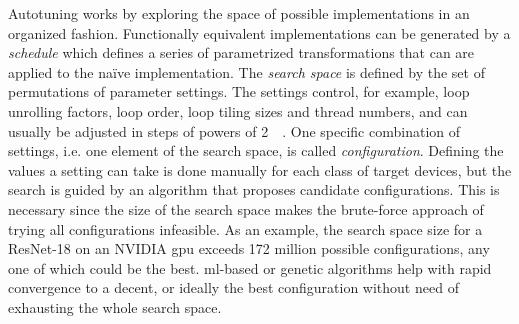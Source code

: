 Autotuning works by exploring the space of possible implementations in an organized fashion. Functionally equivalent implementations can be generated by a \textit{schedule} which defines a series of parametrized transformations that can are applied to the naïve implementation. The \textit{search space} is defined by the set of permutations of parameter settings. The settings control, for example, loop unrolling factors, loop order, loop tiling sizes and thread numbers, and can usually be adjusted in steps of powers of 2~\cite[p.~5]{Chen.2018b}~\cite[p.~16]{Vasilache.2018}. One specific combination of settings, i.e. one element of the search space, is called \textit{configuration}. Defining the values a setting can take is done manually for each class of target devices, but the search is guided by an algorithm that proposes candidate configurations. This is necessary since the size of the search space makes the brute-force approach of trying all configurations infeasible. As an example, the search space size for a ResNet-18 on an NVIDIA \gls{gpu} exceeds 172 million possible configurations, any one of which could be the best. \Gls{ml}-based or genetic algorithms help with rapid convergence to a decent, or ideally the best configuration without need of exhausting the whole search space.

